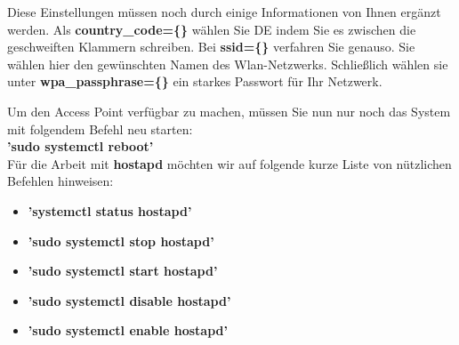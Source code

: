 \noindent Diese Einstellungen müssen noch durch einige Informationen von Ihnen ergänzt werden. Als \textbf{country\_code=\{\}} wählen Sie \glqq DE\grqq{} indem Sie es zwischen die geschweiften Klammern schreiben. Bei \textbf{ssid=\{\}} verfahren Sie genauso. Sie wählen hier den gewünschten Namen des Wlan-Netzwerks. Schließlich wählen sie unter \textbf{wpa\_passphrase=\{\}} ein starkes Passwort für Ihr Netzwerk.\\

\newpage

\noindent Um den Access Point verfügbar zu machen, müssen Sie nun nur noch das System mit folgendem Befehl neu starten:\\

\textbf{’sudo systemctl reboot’}\\

\noindent Für die Arbeit mit \textbf{hostapd} möchten wir auf folgende kurze Liste von nützlichen Befehlen hinweisen:\\

\begin{itemize}
    \item \textbf{’systemctl status hostapd’}
    \item \textbf{’sudo systemctl stop hostapd’}
    \item \textbf{’sudo systemctl start hostapd’}
    \item \textbf{’sudo systemctl disable hostapd’}
    \item \textbf{’sudo systemctl enable hostapd’}
\end{itemize}
